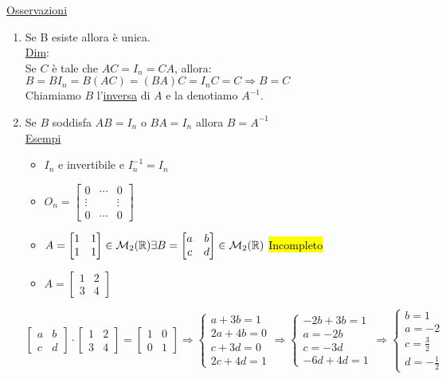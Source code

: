 \documentclass{article}
\begin{document}
\ul{Osservazioni}
\begin{enumerate}
	\item Se B esiste allora è unica.\\
	      \ul{Dim}:\\
	      Se $C$ è tale che $AC=I_n=CA$, allora:\\
	      $B=BI_n=B(AC)=(BA)C=I_nC=C\Rightarrow B=C$\\
	      Chiamiamo $B$ l'\ul{inversa} di $A$ e la denotiamo $A^{-1}$.
	\item Se $B$ soddisfa $AB=I_n$ o $BA=I_n$ allora $B=A^{-1}$\\
	      \ul{Esempi}
	      \begin{itemize}
		      \item $I_n$ e invertibile e $I_n^{-1}=I_n$
		      \item $O_n=\begin{bmatrix}0&\cdots&0\\\vdots&&\vdots\\0&\cdots&0\end{bmatrix}$
		      \item $A=\begin{bmatrix}1&1\\1&1\end{bmatrix}\in\mathcal{M}_2(\mathbb{R})\\\exists B=\begin{bmatrix}a&b\\c&d\end{bmatrix}\in\mathcal{M}_2(\mathbb{R})$ \hl{Incompleto}
		      \item $A=\begin{bmatrix}1&2\\3&4\end{bmatrix}$
	      \end{itemize}

	      $\begin{bmatrix}a&b\\c&d\end{bmatrix}\cdot\begin{bmatrix}1&2\\3&4\end{bmatrix}=\begin{bmatrix}1&0\\0&1\end{bmatrix}\Rightarrow\begin{cases}a+3b=1\\2a+4b=0\\c+3d=0\\2c+4d=1\end{cases}\Rightarrow\begin{cases}-2b+3b=1\\a=-2b\\c=-3d\\-6d+4d=1\end{cases}\Rightarrow\begin{cases}b=1\\a=-2\\c=\frac{3}{2}\\d=-\frac{1}{2}\end{cases}$


\end{enumerate}
\end{document}
